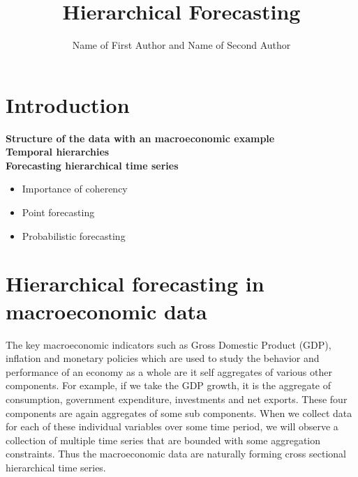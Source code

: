 \documentclass[graybox]{svmult}
\begin{document}
\title*{Hierarchical Forecasting}
\author{Name of First Author and Name of Second Author}
%
%
\maketitle



\section{Introduction}

\textbf{Structure of the data with an macroeconomic example}\\

\textbf{Temporal hierarchies}\\

\textbf{Forecasting hierarchical time series}\\

\begin{itemize}
	\item Importance of coherency
	\item Point forecasting
	\item Probabilistic forecasting
\end{itemize}

\section{Hierarchical forecasting in macroeconomic data} \label{sec:macro data}

The key macroeconomic indicators such as Gross Domestic Product (GDP), inflation and monetary policies which are used to study the behavior and performance of an economy as a whole are it self aggregates of various other components.
For example, if we take the GDP growth, it is the aggregate of consumption, government expenditure, investments and net exports. These four components are again aggregates of some sub components. When we collect data for each of these individual variables over some time period, we will observe a collection of multiple time series that are bounded with some aggregation constraints. Thus the macroeconomic data are naturally forming cross sectional hierarchical time series.
\end{document}
